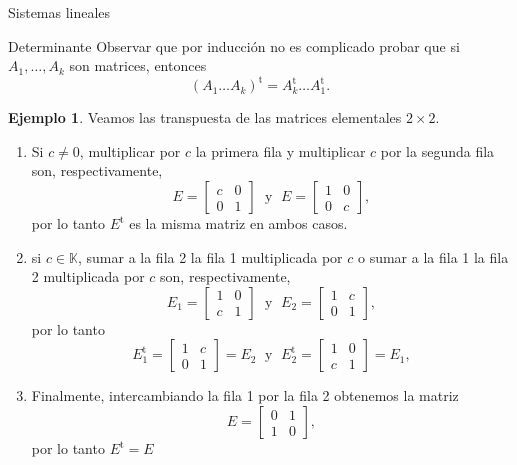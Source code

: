 \documentclass[a4paper,12pt,twoside,spanish,reqno]{amsbook}
\theoremstyle{definition}
\newtheorem{ejemplo}{Ejemplo}[section]
\theoremstyle{remark}
\renewcommand{\t}{{\operatorname{t}}}
\newcommand{\K}{\mathbb K}
\begin{document}
\begin{chapter}{Sistemas lineales}
\begin{section}{Determinante}
	Observar que por inducción no es complicado probar que si $A_1,\ldots, A_k$ son matrices,  entonces 
	\begin{equation*}
	(A_1\ldots A_k)^\t = A_k^\t\ldots A_1^\t.
	\end{equation*}
	
	\begin{ejemplo} Veamos las transpuesta de las matrices elementales  $2 \times 2$.
		\begin{enumerate}
			\item Si $c \not=0$, multiplicar por  $c$ la primera fila y multiplicar $c$ por la segunda fila son, respectivamente,
			\begin{equation*}
			E = \begin{bmatrix} c& 0\\ 0&1\end{bmatrix}\;\text{ y }\; E = \begin{bmatrix} 1& 0\\ 0&c\end{bmatrix},
			\end{equation*}
			por lo tanto $E^\t$ es la misma matriz en ambos casos. 
			\item si  $c \in \K$, sumar a la fila 2 la fila 1 multiplicada por $c$ o sumar a la fila 1 la fila 2 multiplicada por $c$ son, respectivamente,
			\begin{equation*}
			E_1 = \begin{bmatrix} 1& 0\\ c&1\end{bmatrix}\;\text{ y }\; E_2 = \begin{bmatrix} 1& c\\ 0&1\end{bmatrix},
			\end{equation*}
			por lo tanto 
			\begin{equation*}
			E_1^\t = \begin{bmatrix} 1& c\\ 0&1\end{bmatrix} = E_2 \;\text{ y }\; E_2^\t = \begin{bmatrix} 1& 0\\ c&1\end{bmatrix} =E_1,
			\end{equation*}
			\item Finalmente, intercambiando la fila 1 por la fila 2 obtenemos la matriz
			\begin{equation*}
			E = \begin{bmatrix} 0& 1\\ 1&0\end{bmatrix},
			\end{equation*}
			por lo tanto $E^\t =E$
		\end{enumerate}
	\end{ejemplo}
	


\end{section}
\end{chapter}
\end{document}
